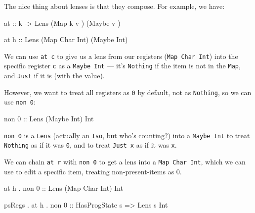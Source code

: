 \documentclass[]{article}
\newenvironment{Shaded}{}{}
\newcommand{\CharTok}[1]{\textcolor[rgb]{0.25,0.44,0.63}{#1}}
\newcommand{\DataTypeTok}[1]{\textcolor[rgb]{0.56,0.13,0.00}{#1}}
\newcommand{\DecValTok}[1]{\textcolor[rgb]{0.25,0.63,0.44}{#1}}
\newcommand{\NormalTok}[1]{#1}
\newcommand{\OperatorTok}[1]{\textcolor[rgb]{0.40,0.40,0.40}{#1}}
\newcommand{\OtherTok}[1]{\textcolor[rgb]{0.00,0.44,0.13}{#1}}
\begin{document}
The nice thing about lenses is that they compose. For example, we have:

\begin{Shaded}
\begin{Highlighting}[]
\OtherTok{at ::}\NormalTok{ k }\OtherTok{{-}\textgreater{}} \DataTypeTok{Lens\textquotesingle{}}\NormalTok{ (}\DataTypeTok{Map}\NormalTok{ k    v  ) (}\DataTypeTok{Maybe}\NormalTok{ v  )}

\NormalTok{at }\CharTok{\textquotesingle{}h\textquotesingle{}}\OtherTok{  ::} \DataTypeTok{Lens\textquotesingle{}}\NormalTok{ (}\DataTypeTok{Map} \DataTypeTok{Char} \DataTypeTok{Int}\NormalTok{) (}\DataTypeTok{Maybe} \DataTypeTok{Int}\NormalTok{)}
\end{Highlighting}
\end{Shaded}

We can use \texttt{at\ \textquotesingle{}c\textquotesingle{}} to give us a lens
from our registers (\texttt{Map\ Char\ Int}) into the specific register
\texttt{\textquotesingle{}c\textquotesingle{}} as a \texttt{Maybe\ Int} --- it's
\texttt{Nothing} if the item is not in the \texttt{Map}, and \texttt{Just} if it
is (with the value).

However, we want to treat all registers as \texttt{0} by default, not as
\texttt{Nothing}, so we can use \texttt{non\ 0}:

\begin{Shaded}
\begin{Highlighting}[]
\NormalTok{non }\DecValTok{0}\OtherTok{ ::} \DataTypeTok{Lens\textquotesingle{}}\NormalTok{ (}\DataTypeTok{Maybe} \DataTypeTok{Int}\NormalTok{) }\DataTypeTok{Int}
\end{Highlighting}
\end{Shaded}

\texttt{non\ 0} is a \texttt{Lens} (actually an \texttt{Iso}, but who's
counting?) into a \texttt{Maybe\ Int} to treat \texttt{Nothing} as if it was
\texttt{0}, and to treat \texttt{Just\ x} as if it was \texttt{x}.

We can chain \texttt{at\ r} with \texttt{non\ 0} to get a lens into a
\texttt{Map\ Char\ Int}, which we can use to edit a specific item, treating
non-present-items as 0.

\begin{Shaded}
\begin{Highlighting}[]
\NormalTok{         at }\CharTok{\textquotesingle{}h\textquotesingle{}} \OperatorTok{.}\NormalTok{ non }\DecValTok{0}\OtherTok{ ::} \DataTypeTok{Lens\textquotesingle{}}\NormalTok{ (}\DataTypeTok{Map} \DataTypeTok{Char} \DataTypeTok{Int}\NormalTok{) }\DataTypeTok{Int}

\NormalTok{psRegs }\OperatorTok{.}\NormalTok{ at }\CharTok{\textquotesingle{}h\textquotesingle{}} \OperatorTok{.}\NormalTok{ non }\DecValTok{0}\OtherTok{ ::} \DataTypeTok{HasProgState}\NormalTok{ s }\OtherTok{=\textgreater{}} \DataTypeTok{Lens\textquotesingle{}}\NormalTok{ s }\DataTypeTok{Int}
\end{Highlighting}
\end{Shaded}
\end{document}
